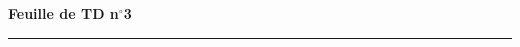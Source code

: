 \documentclass[11pt,a4paper]{article}
\title{}
\date{}
\newcommand{\HRule}{\rule{\linewidth}{0.5mm}}
\begin{document}
\pagestyle{fancy}

\fancyhead{}
 \fancyfoot{}


\newcommand{\lb}{\llbracket}
\newcommand{\rb}{\rrbracket}


\newcommand{\md}[3]{#1\ \equiv \ #2 \! \! \! \! \! \pmod {#3} }
\newcommand{\nmd}[3]{#1 \not \equiv #2 \! \! \! \! \!  \pmod {#3} }
\newcommand{\mda}[3]{#1 \equiv #2 \! \!  \pmod {#3} }
\newcommand{\nmda}[3]{#1 \not \equiv #2 \! \! \pmod {#3} }
\newcommand{\mo}[2]{#1 \! \! \! \! \! \pmod #2 }
\newcommand{\moa}[2]{#1 \! \!  \pmod #2 }


\thispagestyle{fancy}

\begin{center}
    { \huge \bfseries
    Feuille de TD n$^{\boldsymbol{\circ}}$3
     \\ [0cm] }
    \HRule \\[0.5cm]
\end{center}
\
\end{document}
